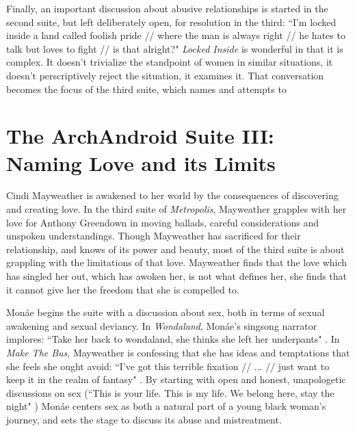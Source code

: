 \documentclass[a4paper, 11pt]{article} %
\begin{document}
Finally, an important discussion about abusive relationships is started in the second suite, but left deliberately open, for resolution in the third:
``I'm locked inside a land called foolish pride // where the man is always right // he hates to talk but loves to fight // is that alright?" \cite{lockedinside}
\emph{Locked Inside} is wonderful in that it is complex. 
It doesn't trivialize the standpoint of women in similar situations, it doesn't perscriptively reject the situation, it examines it.
That conversation becomes the focus of the third suite, which names and attempts to 


\section*{The ArchAndroid Suite III: Naming Love and its Limits}

Cindi Mayweather is awakened to her world by the consequences of discovering and creating love.
In the third suite of \emph{Metropolis}, Mayweather grapples with her love for Anthony Greendown in moving ballads, careful considerations and unspoken understandings.
Though Mayweather has sacrificed for their relationship, and knows of its power and beauty, most of the third suite is about grappling with the limitations of that love.
Mayweather finds that the love which has singled her out, which has awoken her, is not what defines her, she finds that it cannot give her the freedom that she is compelled to.

Mon\'ae begins the suite with a discussion about sex, both in terms of sexual awakening and sexual deviancy.
In \emph{Wondaland}, Mon\'ae's singsong narrator implores: ``Take her back to wondaland, she thinks she left her underpants" \cite{wondaland}.
In \emph{Make The Bus}, Mayweather is confessing that she has ideas and temptations that she feels she ought avoid:
``I've got this terrible fixation // ... // just want to keep it in the realm of fantasy" \cite{makethebus}.
By starting with open and honest, unapologetic discussions on sex (``This is your life. This is my life. We belong here, stay the night" \cite{wondaland}) Mon\'ae centers sex as both a natural part of a young black woman's journey, and sets the stage to discuss its abuse and mistreatment.
\end{document}

